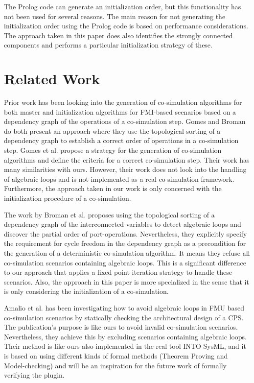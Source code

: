 \documentclass[runningheads]{llncs}
\begin{document}
The Prolog code can generate an initialization order, but this functionality has not been used for several reasons. The main reason for not generating the initialization order using the Prolog code is based on performance considerations. The approach taken in this paper does also identifies the strongly connected components and performs a particular initialization strategy of these.

\section{Related Work}
Prior work \cite{Gomes2019, BromanCompositionCo-Simulation} has been looking into the generation of co-simulation algorithms for both master and initialization algorithms for FMI-based scenarios based on a dependency graph of the operations of a co-simulation step. Gomes and Broman do both present an approach where they use the topological sorting of a dependency graph to establish a correct order of operations in a co-simulation step.
Gomes et al. \cite{Gomes2019} propose a strategy for the generation of co-simulation algorithms and define the criteria for a correct co-simulation step. Their work has many similarities with ours. However, their work does not look into the handling of algebraic loops and is not implemented as a real co-simulation framework. Furthermore, the approach taken in our work is only concerned with the initialization procedure of a co-simulation.

The work by Broman et al. \cite{BromanCompositionCo-Simulation} proposes using the topological sorting of a dependency graph of the interconnected variables to detect algebraic loops and discover the partial order of port-operations. Nevertheless, they explicitly specify the requirement for cycle freedom in the dependency graph as a precondition for the generation of a deterministic co-simulation algorithm. It means they refuse all co-simulation scenarios containing algebraic loops. This is a significant difference to our approach that applies a fixed point iteration strategy to handle these scenarios. Also, the approach in this paper is more specialized in the sense that it is only considering the initialization of a co-simulation. 

Amalio et al. \cite{Amalio2016CheckingCo-simulation} has been investigating how to avoid algebraic loops in FMU based co-simulation scenarios by statically checking the architectural design of a CPS. The publication's purpose is like ours to avoid invalid co-simulation scenarios. Nevertheless, they achieve this by excluding scenarios containing algebraic loops. Their method is like ours also implemented in the real tool INTO-SysML, and it is based on using different kinds of formal methods (Theorem Proving and Model-checking) and will be an inspiration for the future work of formally verifying the plugin. 


%



\end{document}
